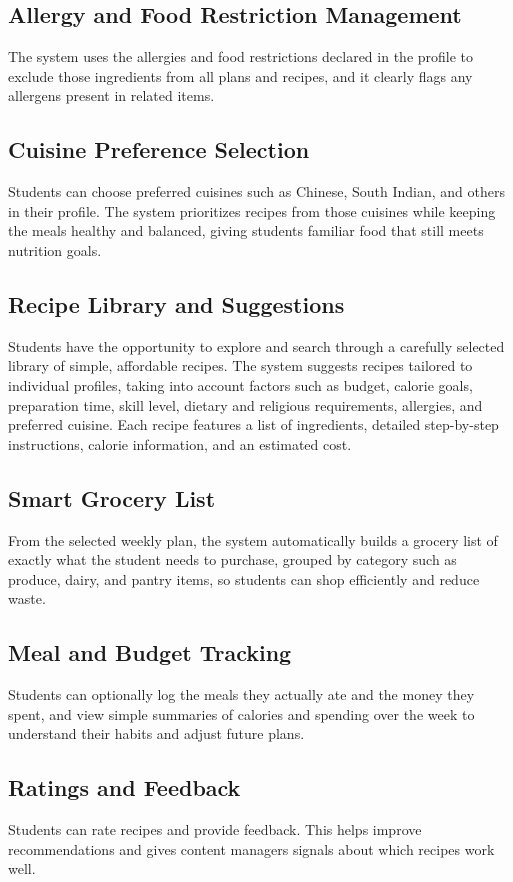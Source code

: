 \documentclass[11pt,a4paper]{article}
\begin{document}
\subsection{Allergy and Food Restriction Management}
The system uses the allergies and food restrictions declared in the profile to exclude those ingredients from all plans and recipes, and it clearly flags any allergens present in related items.

\subsection{Cuisine Preference Selection}
Students can choose preferred cuisines such as Chinese, South Indian, and others in their profile. The system prioritizes recipes from those cuisines while keeping the meals healthy and balanced, giving students familiar food that still meets nutrition goals.

\subsection{Recipe Library and Suggestions}
Students have the opportunity to explore and search through a carefully selected library of simple, affordable recipes. The system suggests recipes tailored to individual profiles, taking into account factors such as budget, calorie goals, preparation time, skill level, dietary and religious requirements, allergies, and preferred cuisine. Each recipe features a list of ingredients, detailed step-by-step instructions, calorie information, and an estimated cost.

\subsection{Smart Grocery List}
From the selected weekly plan, the system automatically builds a grocery list of exactly what the student needs to purchase, grouped by category such as produce, dairy, and pantry items, so students can shop efficiently and reduce waste.

\subsection{Meal and Budget Tracking}
Students can optionally log the meals they actually ate and the money they spent, and view simple summaries of calories and spending over the week to understand their habits and adjust future plans.

\subsection{Ratings and Feedback}
Students can rate recipes and provide feedback. This helps improve recommendations and gives content managers signals about which recipes work well.
\end{document}
